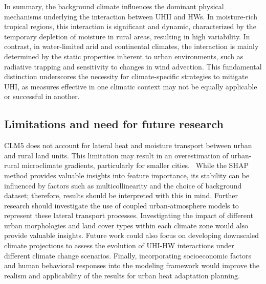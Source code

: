 In summary, the background climate influences the dominant physical mechanisms underlying the interaction between UHII and HWs. In moisture-rich tropical regions, this interaction is significant and dynamic, characterized by the temporary depletion of moisture in rural areas, resulting in high variability. In contrast, in water-limited arid and continental climates, the interaction is mainly determined by the static properties inherent to urban environments, such as radiative trapping and sensitivity to changes in wind advection. This fundamental distinction underscores the necessity for climate-specific strategies to mitigate UHI, as measures effective in one climatic context may not be equally applicable or successful in another.



\subsection*{ \mbox{}\protect\newline  Limitations and need for future research}CLM5 does not account for lateral heat and moisture transport between urban and rural land units. This limitation may result in an overestimation of urban-rural microclimate gradients, particularly for smaller cities.\unskip~\cite{2755510:33598947}  While the SHAP\unskip~\cite{2755510:33598933} method provides valuable insights into feature importance, its stability can be influenced by factors such as multicollinearity and the choice of background dataset; therefore, results should be interpreted with this in mind. Further research should investigate the use of coupled urban-atmosphere models to represent these lateral transport processes. Investigating the impact of different urban morphologies and land cover types within each climate zone would also provide valuable insights. Future work could also focus on developing downscaled climate projections to assess the evolution of UHI-HW interactions under different climate change scenarios. Finally, incorporating socioeconomic factors and human behavioral responses into the modeling framework would improve the realism and applicability of the results for urban heat adaptation planning. 